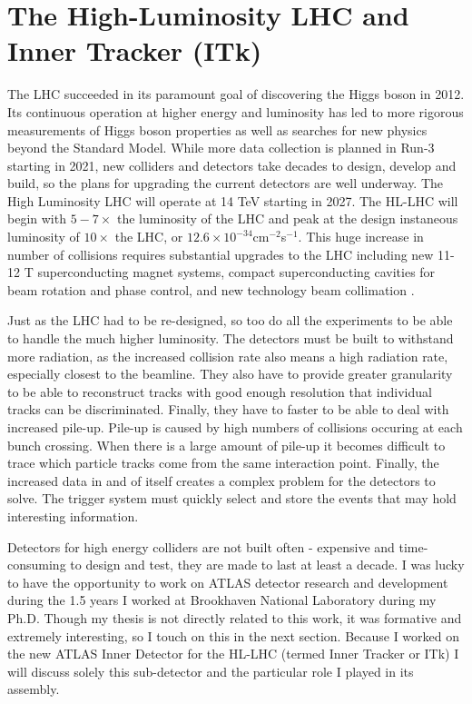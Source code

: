 \section{The High-Luminosity LHC and Inner Tracker (ITk)}
The LHC succeeded in its paramount goal of discovering the Higgs boson in 2012. Its continuous operation at higher energy and luminosity has led to more rigorous measurements of Higgs boson properties as well as searches for new physics beyond the Standard Model. While more data collection is planned in Run-3 starting in 2021, new colliders and detectors take decades to design, develop and build, so the plans for upgrading the current detectors are well underway. The High Luminosity LHC will operate at 14 TeV starting in 2027. The HL-LHC will begin with $5-7\times$ the luminosity of the LHC and peak at the design instaneous luminosity of $10\times$ the LHC, or $12.6\times10^{-34}$cm$^{-2}$s$^{-1}$. This huge increase in number of collisions requires substantial upgrades to the LHC including new 11-12 T superconducting magnet systems, compact superconducting cavities for beam rotation and phase control, and new technology beam collimation \cite{HLLHCYellow}. 

Just as the LHC had to be re-designed, so too do all the experiments to be able to handle the much higher luminosity. The detectors must be built to withstand more radiation, as the increased collision rate also means a high radiation rate, especially closest to the beamline. They also have to provide greater granularity to be able to reconstruct tracks with good enough resolution that individual tracks can be discriminated. Finally, they have to faster to be able to deal with increased pile-up. Pile-up is caused by high numbers of collisions occuring at each bunch crossing. When there is a large amount of pile-up it becomes difficult to trace which particle tracks come from the same interaction point. Finally, the increased data in and of itself creates a complex problem for the detectors to solve. The trigger system must quickly select and store the events that may hold interesting information. 

Detectors for high energy colliders are not built often - expensive and time-consuming to design and test, they are made to last at least a decade. I was lucky to have the opportunity to work on ATLAS detector research and development during the 1.5 years I worked at Brookhaven National Laboratory during my Ph.D. Though my thesis is not directly related to this work, it was formative and extremely interesting, so I touch on this in the next section. Because I worked on the new ATLAS Inner Detector for the HL-LHC (termed Inner Tracker or ITk) I will discuss solely this sub-detector and the particular role I played in its assembly.

